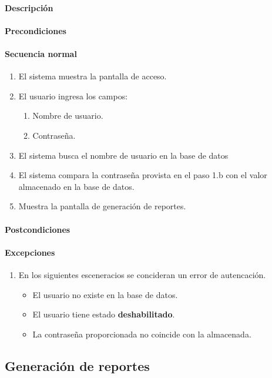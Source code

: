 \paragraph{Descripción}
\paragraph{Precondiciones}
\paragraph{Secuencia normal}
\begin{enumerate}
  \item El sistema muestra la pantalla de acceso.
  \item El usuario ingresa los campos:
  \begin{enumerate}
    \item Nombre de usuario.
    \item Contraseña.
  \end{enumerate}
  \item El sistema busca el nombre de usuario en la base de datos
  \item El sistema compara la contraseña provista en el paso 1.b con el valor almacenado en la base de datos.
  \item Muestra la pantalla de generación de reportes.
\end{enumerate}
\paragraph{Postcondiciones}
\paragraph{Excepciones}
\begin{enumerate}
  \item En los siguientes esceneracios se concideran un error de autencación.
  \begin{itemize}
    \item El usuario no existe en la base de datos.
    \item El usuario tiene estado \textbf{deshabilitado}.
    \item La contraseña proporcionada no coincide con la almacenada. 
  \end{itemize}
\end{enumerate}

\subsection{Generación de reportes}
